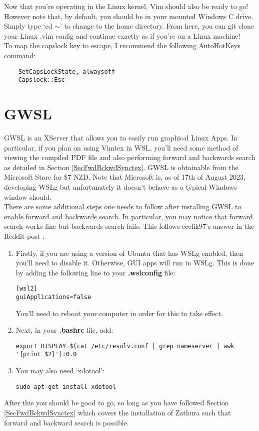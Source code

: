 Now that you're operating in the Linux kernel, Vim should also be ready to go!
However note that, by default, you should be in your mounted Windows C drive.
Simply type `cd $\sim$' to change to the home directory. From here, you can git
clone your Linux .vim config and continue exactly as if you're on a Linux
machine!\\

To map the capslock key to escape, I recommend the following AutoHotKeys
command:
\begin{lstlisting}
    SetCapsLockState, alwaysoff
    Capslock::Esc
\end{lstlisting}

\section{GWSL} \label{SecGWSL}
GWSL is an XServer that allows you to easily run graphical Linux Apps. In
particular, if you plan on using Vimtex in WSL, you'll need some method of
viewing the compiled PDF file and also performing forward and backwards search
as detailed in Section \ref{SecFwdBckwdSynctex}.  GWSL is obtainable from the
Microsoft Store for \$7 NZD. Note that Microsoft is, as of 17th of August 2023,
developing WSLg but unfortunately it doesn't behave as a typical Windows window
should.\\

There are some additional steps one needs to follow after installing GWSL to
enable forward and backwards search. In particular, you may notice that forward
search works fine but backwards search fails. This follows
ccelik97's answer in the Reddit post \cite{soliddeparture9753how}:
\begin{enumerate}
    \item Firstly, if you are using a version of Ubuntu that has WSLg enabled,
        then you'll need to disable it. Otherwise, GUI apps will run in WSLg.
        This is done by adding the following line to your \textbf{.wslconfig}
        file:
\begin{lstlisting}
[wsl2]
guiApplications=false
\end{lstlisting}
        You'll need to reboot your computer in order for this to take effect.
    \item Next, in your \textbf{.bashrc} file, add:
\begin{lstlisting}
export DISPLAY=$(cat /etc/resolv.conf | grep nameserver | awk '{print $2}'):0.0
\end{lstlisting}
    \item You may also need `xdotool':
\begin{lstlisting}
sudo apt-get install xdotool
\end{lstlisting}
\end{enumerate}
After this you should be good to go, so long as you have followed Section
\ref{SecFwdBckwdSynctex} which covers the installation of Zathura such that
forward and backward search is possible.

